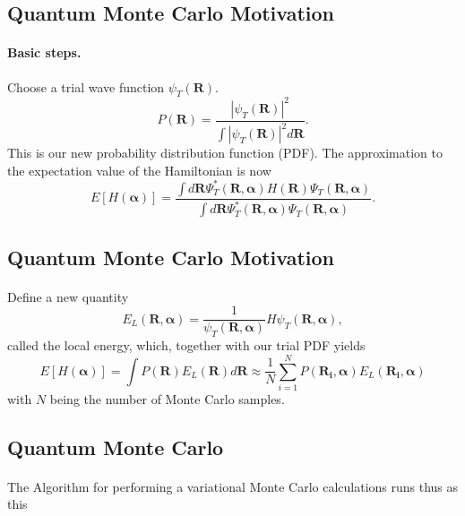 \documentclass[%
twoside,                 %
final,                   %
10pt]{article}
\begin{document}
\noindent




\subsection{Quantum Monte Carlo Motivation}

\paragraph{Basic steps.}
Choose a trial wave function
$\psi_T(\bm{R})$.
\[
   P(\bm{R})= \frac{\left|\psi_T(\bm{R})\right|^2}{\int \left|\psi_T(\bm{R})\right|^2d\bm{R}}.
\]
This is our new probability distribution function  (PDF).
The approximation to the expectation value of the Hamiltonian is now 
\[
   E[H(\bm{\alpha})] = 
   \frac{\int d\bm{R}\Psi^{\ast}_T(\bm{R},\bm{\alpha})H(\bm{R})\Psi_T(\bm{R},\bm{\alpha})}
        {\int d\bm{R}\Psi^{\ast}_T(\bm{R},\bm{\alpha})\Psi_T(\bm{R},\bm{\alpha})}.
\]




\subsection{Quantum Monte Carlo Motivation}

\paragraph{}
Define a new quantity
\[
   E_L(\bm{R},\bm{\alpha})=\frac{1}{\psi_T(\bm{R},\bm{\alpha})}H\psi_T(\bm{R},\bm{\alpha}),
   \label{eq:locale1}
\]
called the local energy, which, together with our trial PDF yields
\[
  E[H(\bm{\alpha})]=\int P(\bm{R})E_L(\bm{R}) d\bm{R}\approx \frac{1}{N}\sum_{i=1}^NP(\bm{R_i},\bm{\alpha})E_L(\bm{R_i},\bm{\alpha})
  \label{eq:vmc1}
\]
with $N$ being the number of Monte Carlo samples.








\subsection{Quantum Monte Carlo}

\paragraph{}
The Algorithm for performing a variational Monte Carlo calculations runs thus as this
\end{document}
